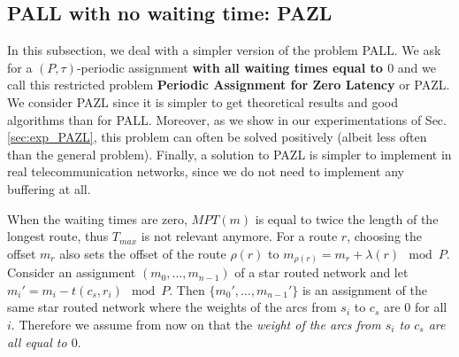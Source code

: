 \documentclass[10pt, conference, letterpaper]{IEEEtran}
\providecommand{\DIFaddtex}[1]{{\protect\color{blue}\uwave{#1}}} %
\providecommand{\DIFdeltex}[1]{{\protect\color{red}\sout{#1}}}                      %
\providecommand{\DIFaddbegin}{} %
\providecommand{\DIFaddend}{} %
\providecommand{\DIFdelbegin}{} %
\providecommand{\DIFdelend}{} %
\providecommand{\DIFadd}[1]{\texorpdfstring{\DIFaddtex{#1}}{#1}} %
\providecommand{\DIFdel}[1]{\texorpdfstring{\DIFdeltex{#1}}{}} %
\newcommand{\DIFscaledelfig}{0.5}
\newlength{\DIFdelgraphicswidth} %
\newlength{\DIFdelgraphicsheight} %
\newcommand{\DIFaddincludegraphics}[2][]{{\color{blue}\fbox{\DIFOincludegraphics[#1]{#2}}}} %
\newcommand{\DIFdelincludegraphics}[2][]{%
\sbox{\DIFdelgraphicsbox}{\DIFOincludegraphics[#1]{#2}}%
\settoboxwidth{\DIFdelgraphicswidth}{\DIFdelgraphicsbox} %
\settoboxtotalheight{\DIFdelgraphicsheight}{\DIFdelgraphicsbox} %
\scalebox{\DIFscaledelfig}{%
\parbox[b]{\DIFdelgraphicswidth}{\usebox{\DIFdelgraphicsbox}\\[-\baselineskip] \rule{\DIFdelgraphicswidth}{0em}}\llap{\resizebox{\DIFdelgraphicswidth}{\DIFdelgraphicsheight}{%
\setlength{\unitlength}{\DIFdelgraphicswidth}%
\begin{picture}(1,1)%
\thicklines\linethickness{2pt} %
{\color[rgb]{1,0,0}\put(0,0){\framebox(1,1){}}}%
{\color[rgb]{1,0,0}\put(0,0){\line( 1,1){1}}}%
{\color[rgb]{1,0,0}\put(0,1){\line(1,-1){1}}}%
\end{picture}%
}\hspace*{3pt}}} %
} %
\DeclareRobustCommand{\DIFaddbegin}{\DIFOaddbegin \let\includegraphics\DIFaddincludegraphics} %
\DeclareRobustCommand{\DIFaddend}{\DIFOaddend \let\includegraphics\DIFOincludegraphics} %
\DeclareRobustCommand{\DIFdelbegin}{\DIFOdelbegin \let\includegraphics\DIFdelincludegraphics} %
\DeclareRobustCommand{\DIFdelend}{\DIFOaddend \let\includegraphics\DIFOincludegraphics} %
\begin{document}
  \subsection{PALL with no waiting time: PAZL}

  In this subsection, we deal with a simpler version of the problem PALL.
  We ask for a $(P,\tau)$-periodic assignment {\bf with all waiting times equal to $0$} and we call this restricted problem {\bf Periodic Assignment for Zero Latency} or PAZL. We consider PAZL since it is simpler to get theoretical results and good algorithms 
  than for PALL. Moreover, as we show in our experimentations of Sec.\ref{sec:exp_PAZL}, this problem can often be solved positively (albeit less often than the general problem). Finally, a solution to PAZL is simpler to implement in real telecommunication networks, since we do not need to implement any buffering at all.    

  When the waiting times are zero, $MPT(m)$ is equal to twice the length of the longest route, thus $T_{max}$ is not relevant anymore. For a route $r$, choosing the offset $m_r$ also sets the offset of the route $\rho(r)$ to $m_{\rho(r)} = m_{r} + \lambda(r) \mod P$.
  Consider an assignment $(m_0,\dots,m_{n-1})$ of a star routed network and let $m_i'= m_{i} - t(c_s,r_i) \mod P$.
  Then \DIFdelbegin \DIFdel{$\{m_0',\dots,m_{n-1}'\}$ }\DIFdelend \DIFaddbegin \DIFadd{$(m_0',\dots,m_{n-1}')$ }\DIFaddend is an assignment of the same star routed network where the weights of the arcs from $s_i$ to $c_s$ are $0$ for all $i$. Therefore we assume from now on that the \emph{weight of the arcs from $s_i$ to $c_s$ are all equal to $0$}.
\end{document}

